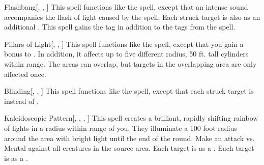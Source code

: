 \lowercase{\hypertarget{spell:Flashbang}{}}\label{spell:Flashbang}
\begin{apability}[\nth{3}]{\hypertarget{spell:Flashbang}{Flashbang}}[, , ]
This spell functions like the  spell, except that an intense sound accompanies the flash of light caused by the spell.
Each struck target is also  as an additional .
This spell gains the  tag in addition to the tags from the  spell.
\end{apability}
\vspace{0.25em}



\lowercase{\hypertarget{spell:Pillars of Light}{}}\label{spell:Pillars of Light}
\begin{apability}[\nth{3}]{\hypertarget{spell:Pillars of Light}{Pillars of Light}}[, , ]
This spell functions like the  spell, except that you gain a  bonus to .
In addition, it affects up to five different \areasmall radius, 50 ft. tall cylinders within range.
The areas can overlap, but targets in the overlapping area are only affected once.
\end{apability}
\vspace{0.25em}



\lowercase{\hypertarget{spell:Blinding}{}}\label{spell:Blinding}
\begin{apability}[\nth{4}]{\hypertarget{spell:Blinding}{Blinding}}[, , ]
This spell functions like the  spell, except that each struck target is  instead of .
\end{apability}
\vspace{0.25em}



\lowercase{\hypertarget{spell:Kaleidoscopic Pattern}{}}\label{spell:Kaleidoscopic Pattern}
\begin{apability}[\nth{4}]{\hypertarget{spell:Kaleidoscopic Pattern}{Kaleidoscopic Pattern}}[, , , ]
This spell creates a brilliant, rapidly shifting rainbow of lights in a \areasmall radius within \rngmed range of you.
They illuminate a 100 foot radius around the area with bright light until the end of the round.
Make an attack vs. Mental against all creatures in the source area.
\hit Each target is \disoriented as a .
\crit Each target is \confused as a .
\end{apability}
\vspace{0.25em}



